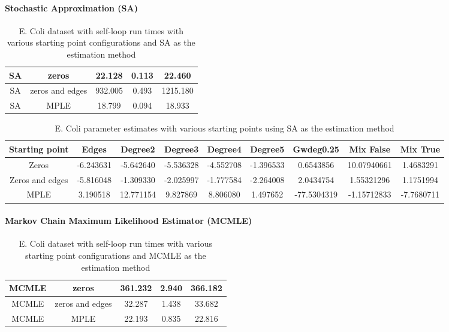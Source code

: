 \paragraph{Stochastic Approximation (SA)}

\begin{table}[H]
\centering
\begin{tabular}{||c | c | c | c | c||}
 \hline
 SA & zeros & 22.128 & 0.113 & 22.460 \\
 \hline
 SA & zeros and edges & 932.005 & 0.493 & 1215.180 \\ 
 \hline
 SA & MPLE & 18.799 & 0.094 & 18.933 \\ 
 \hline
 \end{tabular}
 \label{t:ecoli2_sa}
 \caption{E. Coli dataset with self-loop run times with various starting point configurations and SA as the estimation method}
\end{table}


\begin{table}[H]
\scriptsize
\centering
\begin{tabular}{|| c | c | c | c | c | c | c | c | c ||}
\hline
Starting point & Edges & Degree2 & Degree3 & Degree4 & Degree5 & Gwdeg0.25 & Mix False & Mix True \\
\hline
Zeros & -6.243631 & -5.642640 & -5.536328 & -4.552708 & -1.396533 & 0.6543856 & 10.07940661 & 1.4683291 \\
\hline
Zeros and edges & -5.816048 & -1.309330 & -2.025997 & -1.777584 & -2.264008 & 2.0434754 & 1.55321296 & 1.1751994 \\
\hline
MPLE & 3.190518	& 12.771154 & 9.827869 & 8.806080 & 1.497652 & -77.5304319 & -1.15712833 &-7.7680711 \\
\hline
\end{tabular}
\label{t2:params_ecoli_sa}
\caption{E. Coli parameter estimates with various starting points using SA as the estimation method}
\end{table}

\paragraph{Markov Chain Maximum Likelihood Estimator (MCMLE)}

\begin{table}[H]
\centering
\begin{tabular}{||c | c | c | c | c||}
 \hline
 MCMLE & zeros & 361.232 & 2.940 & 366.182 \\  
 \hline
 MCMLE & zeros and edges & 32.287 & 1.438 & 33.682 \\ 
 \hline
 MCMLE & MPLE & 22.193 & 0.835 & 22.816 \\  
 \hline
\end{tabular}
\label{t:ecoli2}
\caption{E. Coli dataset with self-loop run times with various starting point configurations and MCMLE as the estimation method}
\end{table}

